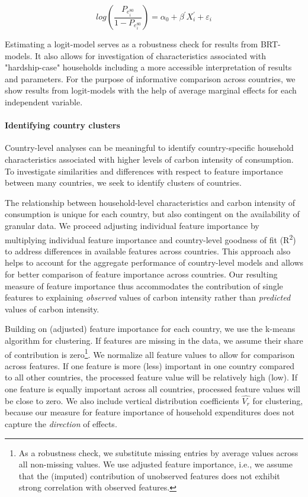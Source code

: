 \documentclass[12pt, a4paper]{article}
\begin{document}
\begin{equation} \label{logit}
    log \left( \frac{P_{e_{i}^{80}}}{1 - P_{e_{i}^{80}}} \right) = \alpha_{0} + \beta^{'} X_{i}^{'} + \varepsilon_{i}
\end{equation}

Estimating a logit-model serves as a robustness check for results from BRT-models. It also allows for investigation of characteristics associated with "hardship-case" households including a more accessible interpretation of results and parameters. For the purpose of informative comparison across countries, we show results from logit-models with the help of average marginal effects for each independent variable.

\paragraph{Identifying country clusters} Country-level analyses can be meaningful to identify country-specific household characteristics associated with higher levels of carbon intensity of consumption. To investigate similarities and differences with respect to feature importance between many countries, we seek to identify clusters of countries. 

The relationship between household-level characteristics and carbon intensity of consumption is unique for each country, but also contingent on the availability of granular data. We proceed adjusting individual feature importance by multiplying individual feature importance and country-level goodness of fit (R\textsuperscript{2}) to address differences in available features across countries. This approach also helps to account for the aggregate performance of country-level models and allows for better comparison of feature importance across countries. Our resulting measure of feature importance thus accommodates the contribution of single features to explaining \textit{observed} values of carbon intensity rather than \textit{predicted} values of carbon intensity.

Building on (adjusted) feature importance for each country, we use the k-means algorithm for clustering. If features are missing in the data, we assume their share of contribution is zero\footnote{As a robustness check, we substitute missing entries by average values across all non-missing values. We use adjusted feature importance, i.e., we assume that the (imputed) contribution of unobserved features does not exhibit strong correlation with observed features.}. We normalize all feature values to allow for comparison across features. If one feature is more (less) important in one country compared to all other countries, the processed feature value will be relatively high (low). If one feature is equally important across all countries, processed feature values will be close to zero. We also include vertical distribution coefficients $\hat{V_{r}}$ for clustering, because our measure for feature importance of household expenditures does not capture the \textit{direction} of effects.
\end{document}
